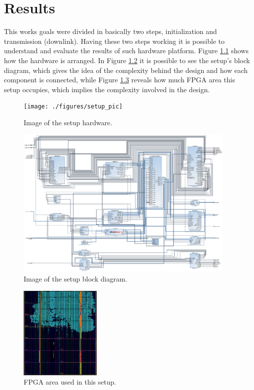 \chapter{Results}
\label{chap:results}

This works goals were divided in basically two steps, initialization and
transmission (downlink). Having these two steps working it is possible to
understand and evaluate the results of such hardware platform. Figure
\ref{fig:setup} shows how the hardware is arranged. In Figure \ref{fig:setupbd}
it is possible to see the setup's block diagram, which gives the idea of the
complexity behind the design and how each component is connected, while Figure
\ref{fig:fpgaarea} reveals how much FPGA area this setup occupies, which implies
the complexity involved in the design.

\begin{figure}[htbp]
    \centering
    \texttt{[image: ./figures/setup\_pic]}
    \caption{ Image of the setup hardware.
    \label{fig:setup}}
\end{figure}

\begin{figure}[htbp]
    \centering
    \includegraphics[width=0.95\textwidth]{./figures/setup_bd}
    \caption{ Image of the setup block diagram.
    \label{fig:setupbd}}
\end{figure}


\begin{figure}[htbp]
    \centering
    \includegraphics[width=0.35\textwidth]{./figures/fpga_area}
    \caption{ FPGA area used in this setup.
    \label{fig:fpgaarea}}
\end{figure}

